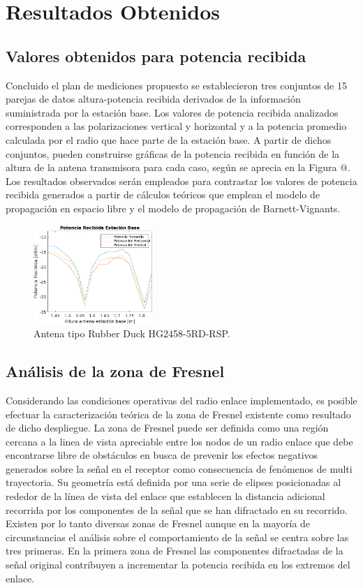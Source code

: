 \documentclass[conference]{IEEEtran}
\begin{document}
\section{Resultados Obtenidos}
\subsection{Valores obtenidos para potencia recibida}
Concluido el plan de mediciones propuesto se establecieron tres conjuntos de 15 parejas de datos altura-potencia recibida derivados de la información suministrada
por la estación base. Los valores de potencia recibida analizados corresponden a las polarizaciones vertical y horizontal y a la potencia
promedio calculada por el radio que hace parte de la estación base. A partir de dichos conjuntos, pueden construirse gráficas de la potencia recibida en función de la 
altura de la antena transmisora para cada caso, según se aprecia en la Figura @. Los resultados observados serán empleados para contrastar los valores de potencia 
recibida generados a partir de cálculos teóricos que emplean el modelo de propagación en espacio libre y el modelo de propagación de Barnett-Vignants.
\begin{figure}
    \centering
          \includegraphics[width=0.4\textwidth]{Potencias.png}
        \caption{Antena tipo Rubber Duck HG2458-5RD-RSP.
        }
        \label{fig:Potencias}
\end{figure}
\subsection{Análisis de la zona de Fresnel}
Considerando las condiciones operativas del radio enlace implementado, es posible efectuar la caracterización teórica de la 
zona de Fresnel existente como resultado de dicho despliegue. La zona de Fresnel puede ser definida como una región cercana a la 
linea de vista apreciable entre los nodos de un radio enlace que debe encontrarse libre de obstáculos en busca de prevenir los efectos negativos
generados sobre la señal en el receptor como consecuencia de fenómenos de multi trayectoria. Su geometría está definida por una serie de elipses 
posicionadas al rededor de la línea de vista del enlace que establecen la distancia adicional recorrida por los componentes de la señal
que se han difractado en su recorrido. Existen por lo tanto diversas zonas de Fresnel aunque en la mayoría de circunstancias el análisis 
sobre el comportamiento de la señal se centra sobre las tres primeras.  En la primera zona de Fresnel las componentes difractadas de la señal
original contribuyen a incrementar la potencia recibida en los extremos del enlace. 
\end{document}
